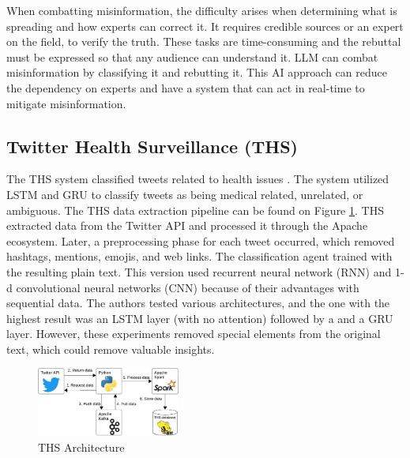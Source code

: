 When combatting misinformation, the difficulty arises when determining what is spreading and how experts can correct it. It requires  credible sources or an expert on the field, to verify the truth.
These tasks are time-consuming and the rebuttal
must be expressed so that any audience can understand it. 
LLM can combat misinformation by classifying it and rebutting it. 
This AI approach can reduce the dependency on experts and have a system that can act in real-time to mitigate misinformation.


\subsection{Twitter Health Surveillance (THS)}
The THS system classified tweets related to health issues \cite{8622504, 9581175}. The system utilized LSTM and GRU to classify tweets as being medical related, unrelated, or ambiguous.  The THS
data extraction pipeline can be found on Figure \ref{ths_architecture}. THS extracted data from the Twitter API and processed it through the Apache ecosystem. Later, a preprocessing phase
for each tweet occurred, which removed hashtags, mentions, emojis, and web links. The classification agent trained with the resulting plain text. This version used recurrent neural network (RNN) and
1-d convolutional neural networks (CNN) because of their advantages with sequential data. The authors tested various  architectures, and the one with the highest result was an LSTM layer (with no attention) followed by a
and a GRU layer.  
However, these experiments removed special elements from the original text,  %
which could remove valuable insights. 

 
  \begin{figure}[!h]
    \centering
        \includegraphics[width=0.42\textwidth]{figures/ths_architecture.jpeg}
        \caption{THS Architecture}
        \label{ths_architecture}
\end{figure}

